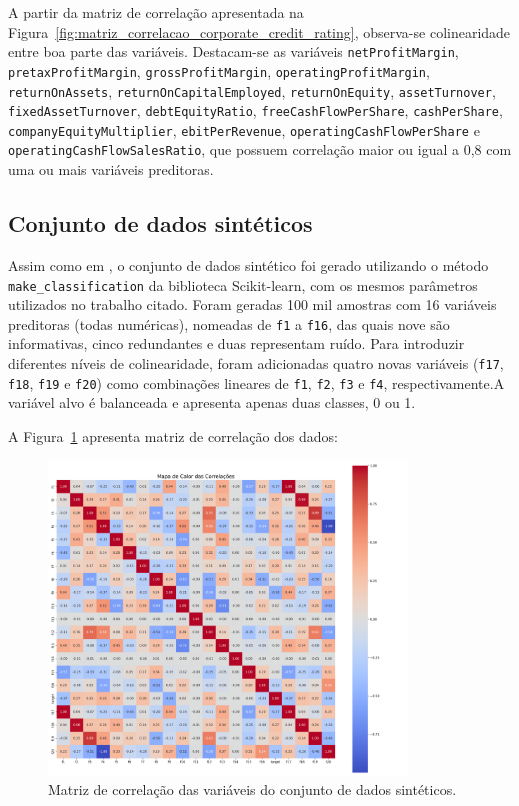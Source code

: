 \begin{sloppypar}
A partir da matriz de correlação apresentada na Figura~\ref{fig:matriz_correlacao_corporate_credit_rating}, observa-se colinearidade entre boa parte das variáveis. Destacam-se as variáveis \texttt{netProfitMargin}, \texttt{pretaxProfitMargin}, \texttt{grossProfitMargin}, \texttt{operatingProfitMargin}, \texttt{returnOnAssets}, \texttt{returnOnCapitalEmployed}, \texttt{returnOnEquity}, \texttt{assetTurnover}, \texttt{fixedAssetTurnover}, \texttt{debtEquityRatio}, \texttt{freeCashFlowPerShare}, \texttt{cashPerShare}, \texttt{companyEquityMultiplier}, \texttt{ebitPerRevenue}, \texttt{operatingCashFlowPerShare} e \texttt{operatingCashFlowSalesRatio}, que possuem correlação maior ou igual a 0,8 com uma ou mais variáveis preditoras.
\end{sloppypar}


\subsection{Conjunto de dados sintéticos}
Assim como em , o conjunto de dados sintético foi gerado utilizando o método \texttt{make\_classification} da biblioteca Scikit-learn, com os mesmos parâmetros utilizados no trabalho citado. Foram geradas 100 mil amostras com 16 variáveis preditoras (todas numéricas), nomeadas de \texttt{f1} a \texttt{f16}, das quais nove são informativas, cinco redundantes e duas representam ruído. Para introduzir diferentes níveis de colinearidade, foram adicionadas quatro novas variáveis (\texttt{f17}, \texttt{f18}, \texttt{f19} e \texttt{f20}) como combinações lineares de \texttt{f1}, \texttt{f2}, \texttt{f3} e \texttt{f4}, respectivamente.A variável alvo é balanceada e apresenta apenas duas classes, 0 ou 1.

A Figura~\ref{fig:matriz_correlacao_dados_sinteticos} apresenta matriz de correlação dos dados:

\begin{figure}[H]
    \centering
    \includegraphics[width=0.85\textwidth]{figs/matriz_correlacao_dados_sinteticos.png}
    \caption{Matriz de correlação das variáveis do conjunto de dados sintéticos.}
    \label{fig:matriz_correlacao_dados_sinteticos}
\end{figure}


